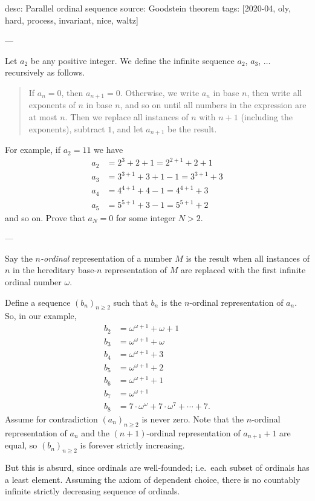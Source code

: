 desc: Parallel ordinal sequence
source: Goodstein theorem
tags: [2020-04, oly, hard, process, invariant, nice, waltz]

---

Let $a_2$ be any positive integer. We define the infinite sequence $a_2$, $a_3$, $\ldots$ recursively as follows.
\begin{quote}
    If $a_n=0$, then $a_{n+1}=0$. Otherwise, we write $a_n$ in base $n$, then write all exponents of $n$ in base $n$, and so on until all numbers in the expression are at most $n$. Then we replace all instances of $n$ with $n+1$ (including the exponents), subtract $1$, and let $a_{n+1}$ be the result.
\end{quote}
For example, if $a_2=11$ we have
\begin{align*}
    a_2&=2^3+2+1=2^{2+1}+2+1\\
    a_3&=3^{3+1}+3+1-1=3^{3+1}+3\\
    a_4&=4^{4+1}+4-1=4^{4+1}+3\\
    a_5&=5^{5+1}+3-1=5^{5+1}+2
\end{align*}
and so on. Prove that $a_N=0$ for some integer $N>2$.

---

Say the \emph{$n$-ordinal} representation of a number $M$ is the result when all instances of $n$ in the hereditary base-$n$ representation of $M$ are replaced with the first infinite ordinal number $\omega$.

Define a sequence $(b_n)_{n\ge2}$ such that $b_n$ is the $n$-ordinal representation of $a_n$. So, in our example,
\begin{align*}
    b_2&=\omega^{\omega+1}+\omega+1\\
    b_3&=\omega^{\omega+1}+\omega\\
    b_4&=\omega^{\omega+1}+3\\
    b_5&=\omega^{\omega+1}+2\\
    b_6&=\omega^{\omega+1}+1\\
    b_7&=\omega^{\omega+1}\\
    b_8&=7\cdot\omega^\omega+7\cdot\omega^7+\cdots+7.
\end{align*}
Assume for contradiction $(a_n)_{n\ge2}$ is never zero. Note that the $n$-ordinal representation of $a_n$ and the $(n+1)$-ordinal representation of $a_{n+1}+1$ are equal, so $(b_n)_{n\ge2}$ is forever strictly increasing.

But this is absurd, since ordinals are well-founded; i.e.\ each subset of ordinals has a least element. Assuming the axiom of dependent choice, there is no countably infinite strictly decreasing sequence of ordinals.
